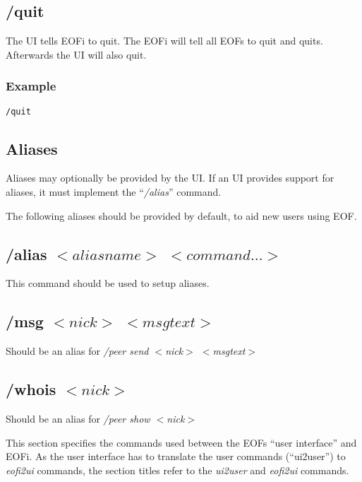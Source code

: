 \documentclass[12pt,a4paper]{book}
\begin{document}
\subsection{/quit}
The UI tells EOFi to quit.
The EOFi will tell all EOFs to quit and quits.
Afterwards the UI will also quit.
\subsubsection{Example}
\begin{verbatim}
/quit
\end{verbatim}
\subsection{Aliases}
Aliases may optionally be provided by the UI. If an UI provides
support for aliases, it must implement the "`\emph{/alias}"' command.

The following aliases should be provided by default,
to aid new users using EOF.
\subsection{/alias $<aliasname>$ $<command...>$}
This command should be used to setup aliases.
\subsection{/msg $<nick>$ $<msgtext>$}
Should be an alias for \textit{/peer send $<$nick$>$ $<$msgtext$>$}
\subsection{/whois $<nick>$}
Should be an alias for \textit{/peer show $<$nick$>$}


This section specifies the commands used between the EOFs
"`user interface"' and EOFi. As the user interface has to translate
the user commands ("`ui2user"') to \emph{eofi2ui} commands, the
section titles refer to the \emph{ui2user} and \emph{eofi2ui} commands.
\end{document}
